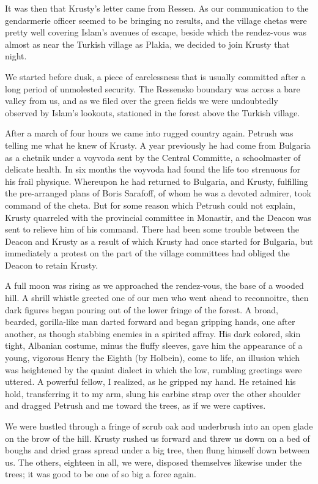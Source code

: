 \documentclass[a5paper,12pt]{book}
\begin{document}
It was then that Krusty’s letter came from Ressen. As our communication to the gendarmerie officer seemed to be bringing no results, and the village chetas were pretty well covering Islam’s avenues of escape, beside which the rendez-vous was almost as near the Turkish village as Plakia, we decided to join Krusty that night. 

We started before dusk, a piece of carelessness that is usually committed after a long period of unmolested security. The Ressensko boundary was across a bare valley from us, and as we filed over the green fields we were undoubtedly observed by Islam’s lookouts, stationed in the forest above the Turkish village.

After a march of four hours we came into rugged country again. Petrush was telling me what he knew of Krusty. A year previously he had come from Bulgaria as a chetnik under a voyvoda sent by the Central Committe, a schoolmaster of delicate health. In six months the voyvoda had found the life too strenuous for his frail physique. Whereupon he had returned to Bulgaria, and Krusty, fulfilling the pre-arranged plans of Boris Sarafoff, of whom he was a devoted admirer, took command of the cheta. But for some reason which Petrush could not explain, Krusty quarreled with the provincial committee in Monastir, and the Deacon was sent to relieve him of his command. There had been some trouble between the Deacon and Krusty as a result of which Krusty had once started for Bulgaria, but immediately a protest on the part of the village committees had obliged the Deacon to retain Krusty. 

A full moon was rising as we approached the rendez-vous, the base of a wooded hill. A shrill whistle greeted one of our men who went ahead to reconnoitre, then dark figures began pouring out of the lower fringe of the forest. A broad, bearded, gorilla-like man darted forward and began gripping hands, one after another, as though stabbing enemies in a spirited affray. His dark colored, skin tight, Albanian costume, minus the fluffy sleeves, gave him the appearance of a young, vigorous Henry the Eighth (by Holbein), come to life, an illusion which was heightened by the quaint dialect in which the low, rumbling greetings were uttered. A powerful fellow, I realized, as he gripped my hand. He retained his hold, transferring it to my arm, slung his carbine strap over the other shoulder and dragged Petrush and me toward the trees, as if we were captives. 

We were hustled through a fringe of scrub oak and underbrush into an open glade on the brow of the hill. Krusty rushed us forward and threw us down on a bed of boughs and dried grass spread under a big tree, then flung himself down between us. The others, eighteen in all, we were, disposed themselves likewise under the trees; it was good to be one of so big a force again. 
\end{document}
